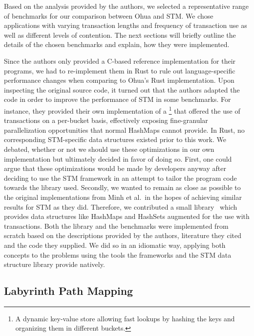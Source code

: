 Based on the analysis provided by the authors, we selected a representative range of benchmarks for our comparison between Ohua and STM.
We chose applications with varying transaction lengths and frequency of transaction use as well as different levels of contention.
The next sections will briefly outline the details of the chosen benchmarks and explain, how they were implemented.


Since the authors only provided a C-based reference implementation for their programs, we had to re-implement them in Rust to rule out language-specific performance changes when comparing to Ohua's Rust implementation.
Upon inspecting the original source code, it turned out that the authors adapted the code in order to improve the performance of STM in some benchmarks.
For instance, they provided their own implementation of a \footnote{A dynamic key-value store allowing fast lookups by hashing the keys and organizing them in different buckets.} that offered the use of transactions on a per-bucket basis, effectively exposing fine-granular parallelization opportunities that normal HashMaps cannot provide.
In Rust, no corresponding STM-specific data structures existed prior to this work.
We debated, whether or not we should use these optimizations in our own implementation but ultimately decided in favor of doing so.
First, one could argue that these optimizations would be made by developers anyway after deciding to use the STM framework in an attempt to tailor the program code towards the library used.
Secondly, we wanted to remain as close as possible to the original implementations from Minh et al.\ in the hopes of achieving similar results for STM as they did.
Therefore, we contributed a small library~\cite{wittwer2020stmdata} which provides data structures like HashMaps and HashSets augmented for the use with transactions.
Both the library and the benchmarks were implemented from scratch based on the descriptions provided by the authors, literature they cited and the code they supplied.
We did so in an idiomatic way, applying both concepts to the problems using the tools the frameworks and the STM data structure library provide natively.



\subsection{Labyrinth Path Mapping}
\label{sec:experiments:labyrinth}

